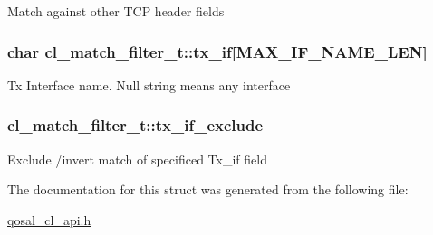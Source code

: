 Match against other T\-C\-P header fields \hypertarget{structcl__match__filter__t_a9301f7b0a961e65e0dd20ff9dd430288}{
\subsubsection[{tx\-\_\-if}]{\setlength{\rightskip}{0pt plus 5cm}char cl\-\_\-match\-\_\-filter\-\_\-t\-::tx\-\_\-if\mbox{[}{\bf M\-A\-X\-\_\-\-I\-F\-\_\-\-N\-A\-M\-E\-\_\-\-L\-E\-N}\mbox{]}}}\label{structcl__match__filter__t_a9301f7b0a961e65e0dd20ff9dd430288}
Tx Interface name. Null string means any interface \hypertarget{structcl__match__filter__t_a38f3b37d5e0e8e7a6e4d8a38a91a4d30}{
\subsubsection[{tx\-\_\-if\-\_\-exclude}]{ cl\-\_\-match\-\_\-filter\-\_\-t\-::tx\-\_\-if\-\_\-exclude}}\label{structcl__match__filter__t_a38f3b37d5e0e8e7a6e4d8a38a91a4d30}
Exclude /invert match of specificed Tx\-\_\-if field 

The documentation for this struct was generated from the following file\-:\begin{DoxyCompactItemize}
\item 
\hyperlink{qosal__cl__api_8h}{qosal\-\_\-cl\-\_\-api.\-h}\end{DoxyCompactItemize}
